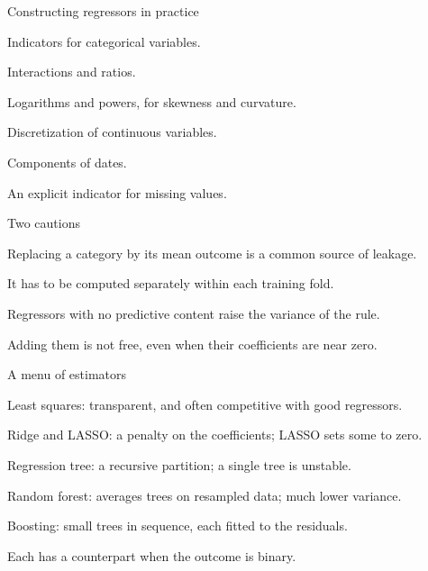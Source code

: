 \documentclass[aspectratio=169,11pt]{beamer}
\newenvironment{wideitemize}{\itemize\addtolength{\itemsep}{9pt}}{\enditemize}
\begin{document}
\begin{frame}{Constructing regressors in practice}
\begin{wideitemize}
  \item Indicators for categorical variables.
  \item Interactions and ratios.
  \item Logarithms and powers, for skewness and curvature.
  \item Discretization of continuous variables.
  \item Components of dates.
  \item An explicit indicator for missing values.
\end{wideitemize}
\end{frame}

\begin{frame}{Two cautions}
\begin{wideitemize}
  \item Replacing a category by its mean outcome is a common source of leakage.
  \item It has to be computed separately within each training fold.
  \item Regressors with no predictive content raise the variance of the rule.
  \item Adding them is not free, even when their coefficients are near zero.
\end{wideitemize}
\end{frame}

\begin{frame}{A menu of estimators}
\begin{wideitemize}
  \item Least squares: transparent, and often competitive with good regressors.
  \item Ridge and LASSO: a penalty on the coefficients; LASSO sets some to zero.
  \item Regression tree: a recursive partition; a single tree is unstable.
  \item Random forest: averages trees on resampled data; much lower variance.
  \item Boosting: small trees in sequence, each fitted to the residuals.
  \item Each has a counterpart when the outcome is binary.
\end{wideitemize}
\end{frame}
\end{document}
